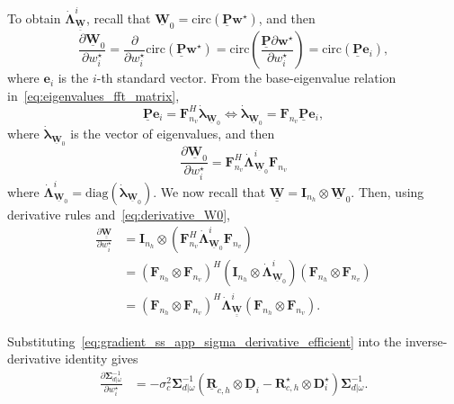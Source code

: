 \documentclass[12pt]{article}
\newcommand{\mycirc}[1] {\underline{\bm{#1}}}
\newcommand{\mybcirc}[1] {\underline{\underline{\bm{#1}}}}
\begin{document}
To obtain $\dot{\bm{\Lambda}}^{i}_{\mybcirc{W}}$, recall that  $\mycirc{W}_0 = \mbox{circ}(\mycirc{P}\bm{w}^{\star})$, and then 
\begin{equation}
    \frac{\partial \mycirc{W}_0}{\partial w_i^{\star}} 
    = \frac{\partial }{\partial w_i^{\star}} \mbox{circ}(\mycirc{P} \bm{w}^{\star})
    = \mbox{circ}(\frac{\mycirc{P} \partial \bm{w}^{\star}}{\partial w_i^{\star}}) = 
    \mbox{circ}(\mycirc{P}\bm{e}_i),
\end{equation}
where $\bm{e}_i$ is the $i$-th standard vector.
From the base-eigenvalue relation in~\eqref{eq:eigenvalues_fft_matrix}, 
\begin{equation}
    \mycirc{P}\bm{e}_i = \bm{F}_{n_{v}}^H \dot{\bm{\lambda}}_{\mycirc{W}_{0}}
    \iff 
    \dot{\bm{\lambda}}_{\mycirc{W}_{0}} = \bm{F}_{n_{v}} \mycirc{P}\bm{e}_i,
\end{equation}
where $\dot{\bm{\lambda}}_{\mycirc{W}_{0}}$ is the vector of eigenvalues, and then
\begin{equation} \label{eq:derivative_W0}
    \frac{\partial \mycirc{W}_0}{\partial w_i^{\star}} = \bm{F}_{n_{v}}^H \dot{\bm{\Lambda}}^{i}_{\mycirc{W}_{0}} \bm{F}_{n_{v}}
\end{equation}
where 
$\dot{\bm{\Lambda}}^{i}_{\mycirc{W}_{0}}=\mbox{diag}(\dot{\bm{\lambda}}_{\mycirc{W}_{0}})$. 
We now recall that $\mybcirc{W} = \bm{I}_{n_{h}} \otimes \mycirc{W}_0$.
Then, using derivative rules and~\eqref{eq:derivative_W0},
\begin{equation}
\begin{split}
    \frac{\partial \mybcirc{W}}{\partial w_i^{\star}}  
    &= \bm{I}_{n_{h}} \otimes (\bm{F}_{n_{v}}^H \dot{\bm{\Lambda}}^{i}_{\mycirc{W}_{0}} \bm{F}_{n_{v}}) \\
    &= (\bm{F}_{n_{h}} \otimes \bm{F}_{n_{v}})^H (\bm{I}_{n_{h}} \otimes \dot{\bm{\Lambda}}^{i}_{\mycirc{W}_{0}}) (\bm{F}_{n_{h}} \otimes \bm{F}_{n_{v}})\\
    &= (\bm{F}_{n_{h}} \otimes \bm{F}_{n_{v}})^H \dot{\bm{\Lambda}}^{i}_{\mybcirc{W}} (\bm{F}_{n_{h}} \otimes \bm{F}_{n_{v}}).
\end{split}
\end{equation}


Substituting~\eqref{eq:gradient_ss_app_sigma_derivative_efficient}
into the inverse-derivative identity gives
\begin{equation}
\begin{split}
    \frac{\partial \bm{\Sigma}_{d|\omega}^{-1}}
    {\partial w_i^\star}
    &=
    -\sigma_c^2
    \bm{\Sigma}_{d|\omega}^{-1}
    \left(
        \mycirc{R}_{c,h}
        \otimes
        \mycirc{D}_i
        -
        \bm{R}_{c,h}^{\star}
        \otimes
        \bm{D}_i^{\star}
    \right)
    \bm{\Sigma}_{d|\omega}^{-1}.
\end{split}
\end{equation}
\end{document}
